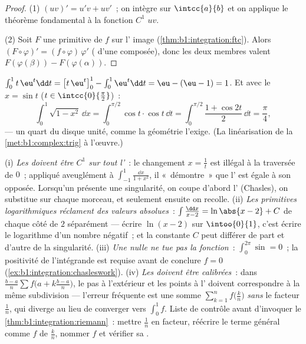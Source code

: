 \begin{proof}
(1) $(uv)' = u'v + uv'$~; on intègre sur $\intcc{a}{b}$ et on applique
le théorème fondamental à la fonction $C^1$ $uv$.

(2) Soit $F$ une primitive de $f$ sur l' image
(\cref{thm:b1:integration:ftc}). Alors $(F \circ \varphi)' = (f
\circ \varphi)\,\varphi'$ ( d'une composée), donc les deux
membres valent $F(\varphi(\beta)) - F(\varphi(\alpha))$.
\end{proof}

\begin{example}\label{ex:b1:integration:parts}
$\int_0^1 t\,\eu^t \dd t = \bigl[t\,\eu^t\bigr]_0^1 - \int_0^1
\eu^t\dd t = \eu - (\eu - 1) = 1$. Et avec le 
$x = \sin t$ ($t \in \intcc{0}{\frac\pi2}$)~:
\[
\int_0^1 \sqrt{1 - x^2}\, \dd x
= \int_0^{\pi/2} \cos t \cdot \cos t \, \dd t
= \int_0^{\pi/2} \frac{1 + \cos 2t}{2}\, \dd t = \frac\pi4 ,
\]
--- un quart du disque unité, comme la géométrie l'exige. (La
linéarisation de la \cref{met:b1:complex:trig} à l'œuvre.)
\end{example}

\begin{remark}
(i) \emph{Les  doivent être $C^1$ sur tout
l'}~: le changement $x = \frac1t$ est illégal à la
traversée de $0$~; appliqué aveuglément à
$\int_{-1}^{1}\frac{\dd x}{1 + x^2}$, il «~démontre~» que
l' est égale à son opposée. Lorsqu'un  présente une singularité, on coupe d'abord l'
(Chasles), on substitue sur chaque morceau, et seulement ensuite on
recolle. (ii) \emph{Les primitives logarithmiques réclament des
valeurs absolues}~: $\int \frac{\dd x}{x - 2} = \ln\abs{x - 2} + C$
de chaque côté de $2$ séparément --- écrire $\ln(x - 2)$ sur
$\intoo{0}{1}$, c'est écrire le logarithme d'un nombre négatif~;
et la constante $C$ peut différer de part et d'autre de la
singularité. (iii) \emph{Une  nulle ne tue pas la
fonction}~: $\int_0^{2\pi}\sin = 0$~; la positivité de
l'intégrande est requise avant de conclure $f = 0$
(\cref{ex:b1:integration:chasleswork}). (iv) \emph{Les  doivent être calibrées}~: dans $\frac{b-a}{n}\sum f\bigl(a +
k\frac{b-a}{n}\bigr)$, le pas à l'extérieur et les points à
l' doivent correspondre à la même subdivision --- l'erreur
fréquente est une somme $\sum_{k=1}^{n} f\bigl(\frac kn\bigr)$
\emph{sans} le facteur $\frac1n$, qui diverge au lieu de converger
vers $\int_0^1 f$. Liste de contrôle avant d'invoquer
le \cref{thm:b1:integration:riemann}~: mettre $\frac1n$ en facteur,
réécrire le terme général comme $f$ de $\frac kn$, nommer $f$ et
vérifier sa .
\end{remark}

